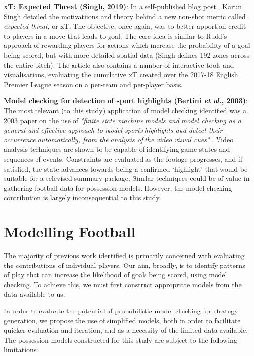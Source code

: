 \documentclass{l4proj}
\begin{document}
\textbf{xT: Expected Threat (Singh, 2019)}: In a self-published blog post \cite{ksing1}, Karun Singh detailed the motivatiions and theory behind a new non-shot metric called \textit{expected threat}, or xT. The objective, once again, was to better apportion credit to players in a move that leads to goal. The core idea is similar to Rudd's approach of rewarding players for actions which increase the probability of a goal being scored, but with more detailed spatial data (Singh defines 192 zones across the entire pitch). The article also contains a number of interactive tools and visualisations, evaluating the cumulative xT created over the 2017-18 English Premier League season on a  per-team and per-player basis.

\textbf{Model checking for detection of sport highlights (Bertini \textit{et al.}, 2003)}: The most relevant (to this study) application of model checking identified was a 2003 paper on the use of \textit{"finite state machine models and model checking as a general and effective approach to model sports highlights and detect their occurrence automatically, from the analysis of the video visual cues"} \cite{bert1}. Video analysis techniques are shown to be capable of identifying game states and sequences of events. Constraints are evaluated as the footage progresses, and if satisfied, the state advances towards being a confirmed `highlight' that would be suitable for a televised summary package. Similar techniques could be of value in gathering football data for possession models. However, the model checking contribution is largely inconsequential to this study.


\chapter{Modelling Football}\label{limits}

The majority of previous work identified is primarily concerned with evaluating the contributions of individual players. Our aim, broadly, is to identify patterns of play that can increase the likelihood of goals being scored, using model checking. To achieve this, we must first construct appropriate models from the data available to us.

In order to evaluate the potential of probabilistic model checking for strategy generation, we propose the use of simplified models, both in order to facilitate quicker evaluation and iteration, and as a necessity of the limited data available. The possession models constructed for this study are subject to the following limitations:
\end{document}
